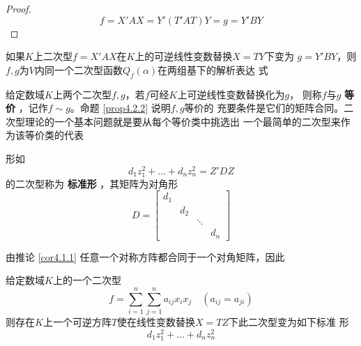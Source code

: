 \documentclass[11pt]{article}
\begin{document}
\begin{proof}
\begin{equation*}
f=X'AX=Y'(T'AT)Y=g=Y'BY
\end{equation*}
\end{proof}

\begin{corollary}[]
\label{cor4.2.2}
如果\(K\)上二次型\(f=X'AX\)在\(K\)上的可逆线性变数替换\(X=TY\)下变为
\(g=Y'BY\)，则\(f,g\)为\(V\)内同一个二次型函数\(Q_f(\alpha)\)在两组基下的解析表达
式
\end{corollary}

给定数域\(K\)上两个二次型\(f,g\)，若\(f\)可经\(K\)上可逆线性变数替换化为\(g\)，
则称\(f\)与\(g\) \textbf{等价} ，记作\(f\sim g\)。命题 \ref{prop4.2.2} 说明\(f,g\)等价的
充要条件是它们的矩阵合同。二次型理论的一个基本问题就是要从每个等价类中挑选出
一个最简单的二次型来作为该等价类的代表

形如
\begin{equation*}
d_1z_1^2+\dots+d_nz_n^2=Z'DZ
\end{equation*}
的二次型称为 \textbf{标准形} ，其矩阵为对角形
\begin{equation*}
D=
\begin{bmatrix}
d_1&&&\\
&d_2&&\\
&&\ddots&\\
&&&d_n
\end{bmatrix}
\end{equation*}

由推论 \ref{cor4.1.1} 任意一个对称方阵都合同于一个对角矩阵，因此
\begin{theorem}[]
给定数域\(K\)上的一个二次型
\begin{equation*}
f=\sum_{i=1}^n\sum_{j=1}^na_{ij}x_ix_j\quad(a_{ij}=a_{ji})
\end{equation*}
则存在\(K\)上一个可逆方阵\(T\)使在线性变数替换\(X=TZ\)下此二次型变为如下标准
形
\begin{equation*}
d_1z_1^2+\dots+d_nz_n^2
\end{equation*}
\end{theorem}
\end{document}
